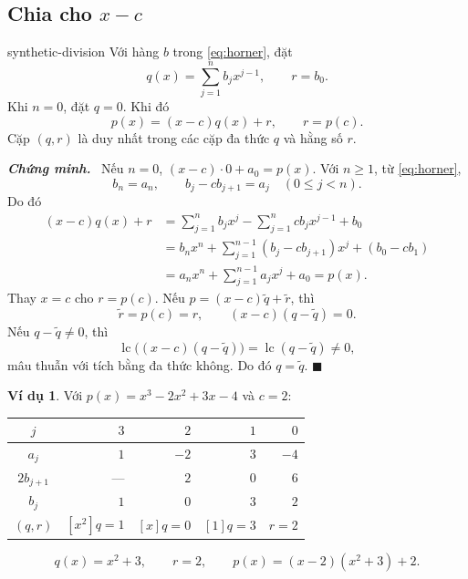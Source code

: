 \documentclass[12pt,a4paper,oneside]{book}
\numberwithin{algorithm}{chapter}
\theoremstyle{definition}
\newtheorem{vidu}{Ví dụ}[chapter]
\newenvironment{chungminh}{\par\medskip\noindent\textbf{\textit{\color{mainblue}Chứng minh.}}\ }{\hfill$\blacksquare$\par\medskip}
\newcommand{\lc}{\operatorname{lc}}
\begin{document}
\subsection{Chia cho \texorpdfstring{$x-c$}{x-c}}
\begin{dinhly}{}{synthetic-division}
Với hàng $b$ trong \eqref{eq:horner}, đặt
\[
 q(x)=\sum_{j=1}^{n}b_jx^{j-1},\qquad r=b_0.
\]
Khi $n=0$, đặt $q=0$. Khi đó
\begin{equation}\label{eq:synthetic-division}
 p(x)=(x-c)q(x)+r,\qquad r=p(c).
\end{equation}
Cặp $(q,r)$ là duy nhất trong các cặp đa thức $q$ và hằng số $r$.
\end{dinhly}
\begin{chungminh}
Nếu $n=0$, $(x-c)\cdot0+a_0=p(x)$. Với $n\geq1$, từ \eqref{eq:horner},
\[
 b_n=a_n,\qquad b_j-cb_{j+1}=a_j\quad(0\leq j<n).
\]
Do đó
\begin{align*}
 (x-c)q(x)+r
 &=\sum_{j=1}^{n}b_jx^j
   -\sum_{j=1}^{n}cb_jx^{j-1}+b_0\\
 &=b_nx^n+\sum_{j=1}^{n-1}(b_j-cb_{j+1})x^j+(b_0-cb_1)\\
 &=a_nx^n+\sum_{j=1}^{n-1}a_jx^j+a_0=p(x).
\end{align*}
Thay $x=c$ cho $r=p(c)$. Nếu $p=(x-c)\widetilde q+\widetilde r$, thì
\[
 \widetilde r=p(c)=r,\qquad(x-c)(q-\widetilde q)=0.
\]
Nếu $q-\widetilde q\ne0$, thì
\[
 \lc\bigl((x-c)(q-\widetilde q)\bigr)=\lc(q-\widetilde q)\ne0,
\]
mâu thuẫn với tích bằng đa thức không. Do đó $q=\widetilde q$.
\end{chungminh}

\begin{vidu}
Với $p(x)=x^3-2x^2+3x-4$ và $c=2$:
\begin{center}
\begin{tabular}{c|rrr|r}
\toprule
$j$ & $3$ & $2$ & $1$ & $0$\\
\midrule
$a_j$ & $1$ & $-2$ & $3$ & $-4$\\
$2b_{j+1}$ & --- & $2$ & $0$ & $6$\\
\midrule
$b_j$ & $1$ & $0$ & $3$ & $\boxed{2}$\\
\midrule
$(q,r)$ & $[x^2]q=1$ & $[x]q=0$ & $[1]q=3$ & $r=2$\\
\bottomrule
\end{tabular}
\end{center}
\[
 q(x)=x^2+3,\qquad r=2,\qquad
 p(x)=(x-2)(x^2+3)+2.
\]
\end{vidu}

\end{document}
